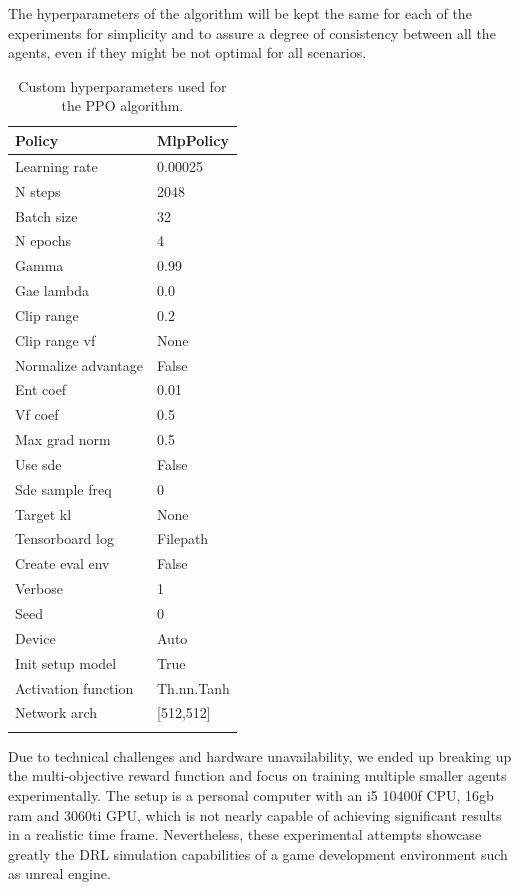 \documentclass[a4paper,one side,12pt]{book}
\begin{document}
The hyperparameters of the algorithm will be kept the same for each of the experiments for simplicity and 
to assure a degree of consistency between all the agents, even if they might be not optimal for all scenarios.
\begin{longtable} 
{|m{7em}||m{7em}|}
    \hline
        Policy & MlpPolicy \\
        \hline
        Learning rate	&0.00025\\\hline
        N steps	&2048\\\hline
        Batch size&	32\\\hline
        N epochs	&4\\\hline
        Gamma	&0.99\\\hline
        Gae lambda&	0.0\\\hline
        Clip range	&0.2\\\hline
        Clip range vf	&None\\\hline
        Normalize advantage&	False\\\hline
        Ent coef	&0.01\\\hline
        Vf coef&	0.5\\\hline
        Max grad norm&	0.5\\\hline
        Use sde	&False\\\hline
        Sde sample freq&	0\\\hline
        Target kl	&None \\\hline
        Tensorboard log&	Filepath\\\hline
        Create eval env	&False\\\hline
        Verbose	&1\\\hline
        Seed	&0\\\hline
        Device	&Auto\\\hline
        Init setup model&	True\\\hline
        Activation function&	Th.nn.Tanh\\\hline
        Network arch&	[512,512]\\\hline

        
         \caption{Custom hyperparameters used for the PPO algorithm.}
\end{longtable}

Due to technical challenges and hardware unavailability, we ended up breaking up the multi-objective reward function 
and focus on training multiple smaller agents experimentally. The setup is a personal computer with an 
 i5 10400f CPU, 16gb ram and 3060ti GPU, which is not nearly capable of achieving 
 significant results in a realistic time frame. Nevertheless, these experimental 
 attempts showcase greatly the DRL simulation capabilities of a game development environment such as unreal engine. 
\end{document}
